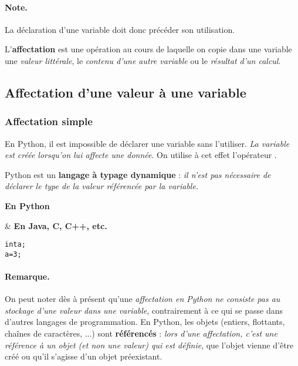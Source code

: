 \documentclass{article}
\newcommand{\tmem}[1]{{\em #1\/}}
\newcommand{\tmstrong}[1]{\textbf{#1}}
\newcommand{\tmtextbf}[1]{{\bfseries{#1}}}
\newenvironment{tmcode}[1][]{\begin{alltt} }{\end{alltt}}
{\theorembodyfont{\rmfamily\small}\newtheorem{exercise}{Exercise}}
\begin{document}
\paragraph{Note.} La déclaration d'une variable doit donc précéder son
utilisation.

\begin{tmornamented}[roundcorner=1.7ex]
  L'\tmtextbf{affectation} est une opération au cours de laquelle on copie
  dans une variable une {\tmem{valeur littérale}}, le {\tmem{contenu d'une
  autre variable}} ou le {\tmem{résultat d'un calcul}}.
\end{tmornamented}

\subsection{Affectation d'une valeur à une variable}

\subsubsection{Affectation simple}

\begin{tmornamented}[roundcorner=1.7ex]
  En Python, il est impossible de déclarer une variable sans l'utiliser.
  {\tmem{La variable est créée lorsqu'on lui affecte une donnée}}. On
  utilise à cet effet l'opérateur {\python{=}}.
  
  Python est un {\tmstrong{langage à typage dynamique}} : {\tmem{il n'est pas
  nécessaire de déclarer le type de la valeur référencée par la
  variable}}.
\end{tmornamented}

\begin{widetabular}
  {\tmstrong{En Python}}
  
  {} & {\tmstrong{En Java, C, C++, etc.}}
  
  \begin{tmcode}[cpp]
  int a;
a = 3;
  \end{tmcode}
\end{widetabular}

\paragraph{Remarque.} On peut noter dès à présent qu'une {\tmem{affectation
en Python ne consiste pas au stockage d'une valeur dans une variable}},
contrairement à ce qui se passe dans d'autres langages de programmation. En
Python, les objets (entiers, flottants, chaînes de caractères, ...) sont
\tmtextbf{référencés} : {\tmem{lors d'une affectation, c'est une
référence à un objet (et non une valeur) qui est définie}}, que l'objet
vienne d'être créé ou qu'il s'agisse d'un objet préexistant.
\end{document}
